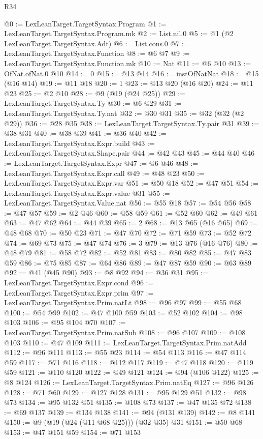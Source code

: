 \begin{lexlean}{R34}
\begin{coremodule}
@0 := LexLeanTarget.TargetSyntax.Program
@1 := LexLeanTarget.TargetSyntax.Program.mk
@2 := List.nil.{0}
@5 := @1 (@2 LexLeanTarget.TargetSyntax.Adt)
@6 := List.cons.{0}
@7 := LexLeanTarget.TargetSyntax.Function
@8 := @6 @7
@9 := LexLeanTarget.TargetSyntax.Function.mk
@10 := Nat
@11 := @6 @10
@13 := OfNat.ofNat.{0} @10
@14 := 0
@15 := @13 @14
@16 := instOfNatNat
@18 := @15 (@16 @14)
@19 := @11 @18
@20 := 1
@23 := @13 @20 (@16 @20)
@24 := @11 @23
@25 := @2 @10
@28 := @9 (@19 (@24 @25))
@29 := LexLeanTarget.TargetSyntax.Ty
@30 := @6 @29
@31 := LexLeanTarget.TargetSyntax.Ty.nat
@32 := @30 @31
@35 := @32 (@32 (@2 @29))
@36 := @28 @35
@38 := LexLeanTarget.TargetSyntax.Ty.pair @31
@39 := @38 @31
@40 := @38 @39
@41 := @36 @40
@42 := LexLeanTarget.TargetSyntax.Expr.build
@43 := LexLeanTarget.TargetSyntax.Shape.pair
@44 := @42 @43
@45 := @44 @40
@46 := LexLeanTarget.TargetSyntax.Expr
@47 := @6 @46
@48 := LexLeanTarget.TargetSyntax.Expr.call
@49 := @48 @23
@50 := LexLeanTarget.TargetSyntax.Expr.var
@51 := @50 @18
@52 := @47 @51
@54 := LexLeanTarget.TargetSyntax.Expr.value @31
@55 := LexLeanTarget.TargetSyntax.Value.nat
@56 := @55 @18
@57 := @54 @56
@58 := @47 @57
@59 := @2 @46
@60 := @58 @59
@61 := @52 @60
@62 := @49 @61
@63 := @47 @62
@64 := @44 @39
@65 := 2
@68 := @13 @65 (@16 @65)
@69 := @48 @68
@70 := @50 @23
@71 := @47 @70
@72 := @71 @59
@73 := @52 @72
@74 := @69 @73
@75 := @47 @74
@76 := 3
@79 := @13 @76 (@16 @76)
@80 := @48 @79
@81 := @58 @72
@82 := @52 @81
@83 := @80 @82
@85 := @47 @83 @59
@86 := @75 @85
@87 := @64 @86
@89 := @47 @87 @59
@90 := @63 @89
@92 := @41 (@45 @90)
@93 := @8 @92
@94 := @36 @31
@95 := LexLeanTarget.TargetSyntax.Expr.cond
@96 := LexLeanTarget.TargetSyntax.Expr.prim
@97 := LexLeanTarget.TargetSyntax.Prim.natLt
@98 := @96 @97
@99 := @55 @68
@100 := @54 @99
@102 := @47 @100 @59
@103 := @52 @102
@104 := @98 @103
@106 := @95 @104 @70
@107 := LexLeanTarget.TargetSyntax.Prim.natSub
@108 := @96 @107
@109 := @108 @103
@110 := @47 @109
@111 := LexLeanTarget.TargetSyntax.Prim.natAdd
@112 := @96 @111
@113 := @55 @23
@114 := @54 @113
@116 := @47 @114 @59
@117 := @71 @116
@118 := @112 @117
@119 := @47 @118
@120 := @119 @59
@121 := @110 @120
@122 := @49 @121
@124 := @94 (@106 @122)
@125 := @8 @124
@126 := LexLeanTarget.TargetSyntax.Prim.natEq
@127 := @96 @126
@128 := @71 @60
@129 := @127 @128
@131 := @95 @129 @51
@132 := @98 @73
@134 := @95 @132 @51
@135 := @108 @73
@137 := @47 @135 @72
@138 := @69 @137
@139 := @134 @138
@141 := @94 (@131 @139)
@142 := @8 @141
@150 := @9 (@19 (@24 (@11 @68 @25))) (@32 @35) @31
@151 := @50 @68
@153 := @47 @151 @59
@154 := @71 @153

\end{coremodule}
\end{lexlean}
